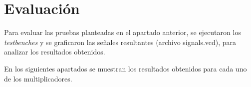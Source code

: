 \newpage
\section{Evaluaci\' on}

\par Para evaluar las pruebas planteadas en el apartado anterior, se ejecutaron los \textit{testbenches} y se graficaron las se\~ nales resultantes (archivo signals.vcd), para analizar los resultados obtenidos.
\\
\par En los siguientes apartados se muestran los resultados obtenidos para cada uno de los multiplicadores.

